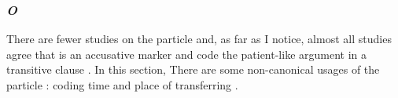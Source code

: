 \subsubsection{\textit{O}}

There are fewer studies on the particle  and,
as far as I notice, almost all studies agree that  is an accusative marker
and code the patient-like argument in a transitive clause \cite[e.g.,][]{yamada36,shibatani90}.
In this section,
There are some non-canonical usages of the particle :
coding time and place of transferring \cite{yamada36}.

%
%
%
%
